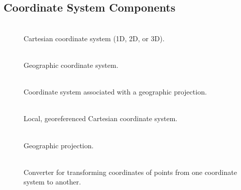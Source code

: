 \subsection{Coordinate System Components}
\begin{description}
\item [] \\
Cartesian coordinate system (1D, 2D, or 3D).
\item [] \\
Geographic coordinate system.
\item [] \\
Coordinate system associated with a geographic projection.
\item [] \\
Local, georeferenced Cartesian coordinate system.
\item [] \\
Geographic projection.
\item [] \\
Converter for transforming coordinates of points from one coordinate
system to another.
\end{description}

